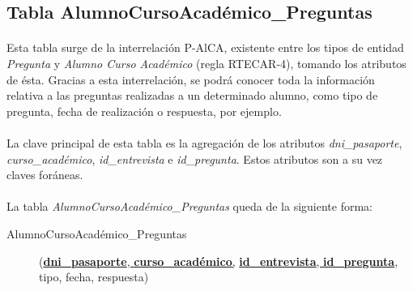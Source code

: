    \subsection{Tabla AlumnoCursoAcadémico\_Preguntas}

      \paragraph{}Esta tabla surge de la interrelación P-AlCA, existente entre
      los tipos de entidad \textit{Pregunta} y \textit{Alumno Curso Académico}
      (regla RTECAR-4), tomando los atributos de ésta. Gracias a esta
      interrelación, se podrá conocer toda la información relativa a las
      preguntas realizadas a un determinado alumno, como tipo de pregunta, fecha
      de realización o respuesta, por ejemplo.

      \paragraph{}La clave principal de esta tabla es la agregación de los
      atributos \textit{dni\_pasaporte}, \textit{curso\_académico},
      \textit{id\_entrevista} e \textit{id\_pregunta}. Estos atributos son a su
      vez claves foráneas.

      \paragraph{}La tabla
      \textit{AlumnoCursoAcadémico\_Preguntas} queda de la siguiente forma:

      \begin{description}
         \item[AlumnoCursoAcadémico\_Preguntas] \begin{flushleft}(\underline{\textbf{dni\_pasaporte}, \textbf{curso\_académico},}
         \underline{\textbf{id\_entrevista}, \textbf{id\_pregunta}},
         tipo, fecha, respuesta)\end{flushleft}
      \end{description}